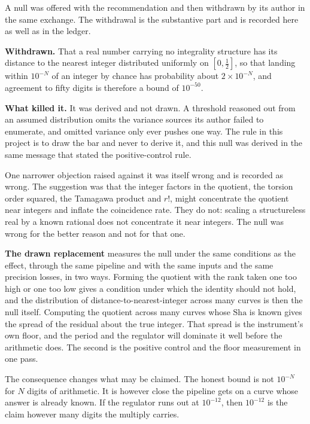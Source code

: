 A null was offered with the recommendation and then withdrawn by its author in the same exchange.
The withdrawal is the substantive part and is recorded here as well as in the ledger.

\textbf{Withdrawn.} That a real number carrying no integrality structure has its distance to the
nearest integer distributed uniformly on $[0,\tfrac12]$, so that landing within $10^{-N}$ of an
integer by chance has probability about $2\times10^{-N}$, and agreement to fifty digits is
therefore a bound of $10^{-50}$.

\textbf{What killed it.} It was derived and not drawn. A threshold reasoned out from an assumed
distribution omits the variance sources its author failed to enumerate, and omitted variance only
ever pushes one way. The rule in this project is to draw the bar and never to derive it, and this
null was derived in the same message that stated the positive-control rule.

One narrower objection raised against it was itself wrong and is recorded as wrong. The suggestion
was that the integer factors in the quotient, the torsion order squared, the Tamagawa product and
$r!$, might concentrate the quotient near integers and inflate the coincidence rate. They do not:
scaling a structureless real by a known rational does not concentrate it near integers. The null was
wrong for the better reason and not for that one.

\textbf{The drawn replacement} measures the null under the same conditions as the effect, through
the same pipeline and with the same inputs and the same precision losses, in two ways. Forming the
quotient with the rank taken one too high or one too low gives a condition under which the identity
should not hold, and the distribution of distance-to-nearest-integer across many curves is then the
null itself. Computing the quotient across many curves whose $\mathrm{Sha}$ is known gives the
spread of the residual about the true integer. That spread is the instrument's own floor, and the
period and the regulator will dominate it well before the arithmetic does. The second is the
positive control and the floor measurement in one pass.

The consequence changes what may be claimed. The honest bound is not $10^{-N}$ for $N$ digits of
arithmetic. It is however close the pipeline gets on a curve whose answer is already known. If the
regulator runs out at $10^{-12}$, then $10^{-12}$ is the claim however many digits the multiply
carries.

